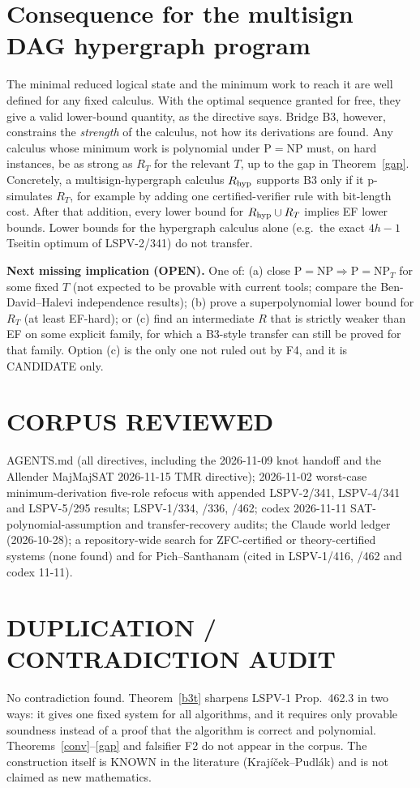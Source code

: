 \documentclass[11pt]{article}
\begin{document}
\section{Consequence for the multisign DAG hypergraph program}
The minimal reduced logical state and the minimum work to reach it are well defined for any fixed calculus. With the optimal sequence granted for free, they give a valid lower-bound quantity, as the directive says. Bridge B3, however, constrains the \emph{strength} of the calculus, not how its derivations are found. Any calculus whose minimum work is polynomial under P$=$NP must, on hard instances, be as strong as $R_{T}$ for the relevant $T$, up to the gap in Theorem~\ref{gap}. Concretely, a multisign-hypergraph calculus $R_{\rm hyp}$ supports B3 only if it p-simulates $R_T$, for example by adding one certified-verifier rule with bit-length cost. After that addition, every lower bound for $R_{\rm hyp}\cup R_T$ implies EF lower bounds. Lower bounds for the hypergraph calculus alone (e.g.\ the exact $4h-1$ Tseitin optimum of LSPV-2/341) do not transfer.

\textbf{Next missing implication (OPEN).} One of: (a) close $\mathrm{P{=}NP}\Rightarrow\mathrm{P{=}NP}_T$ for some fixed $T$ (not expected to be provable with current tools; compare the Ben-David--Halevi independence results); (b) prove a superpolynomial lower bound for $R_T$ (at least EF-hard); or (c) find an intermediate $R$ that is strictly weaker than EF on some explicit family, for which a B3-style transfer can still be proved for that family. Option (c) is the only one not ruled out by F4, and it is CANDIDATE only.

\section*{CORPUS REVIEWED}
AGENTS.md (all directives, including the 2026-11-09 knot handoff and the Allender MajMajSAT 2026-11-15 TMR directive); 2026-11-02 worst-case minimum-derivation five-role refocus with appended LSPV-2/341, LSPV-4/341 and LSPV-5/295 results; LSPV-1/334, /336, /462; codex 2026-11-11 SAT-polynomial-assumption and transfer-recovery audits; the Claude world ledger (2026-10-28); a repository-wide search for ZFC-certified or theory-certified systems (none found) and for Pich--Santhanam (cited in LSPV-1/416, /462 and codex 11-11).
\section*{DUPLICATION / CONTRADICTION AUDIT}
No contradiction found. Theorem~\ref{b3t} sharpens LSPV-1 Prop.~462.3 in two ways: it gives one fixed system for all algorithms, and it requires only provable soundness instead of a proof that the algorithm is correct and polynomial. Theorems~\ref{conv}--\ref{gap} and falsifier F2 do not appear in the corpus. The construction itself is KNOWN in the literature (Krajíček--Pudlák) and is not claimed as new mathematics.
\end{document}
